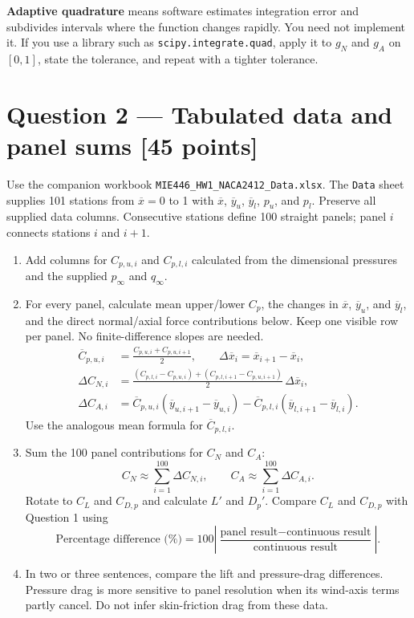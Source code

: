 \documentclass[11pt]{article}
\newcommand{\X}{\overline{x}}
\newcommand{\Yu}{\overline{y}_u}
\newcommand{\Yl}{\overline{y}_l}
\begin{document}
\textbf{Adaptive quadrature} means software estimates integration error and subdivides intervals where the function changes rapidly. You need not implement it. If you use a library such as \texttt{scipy.integrate.quad}, apply it to $g_N$ and $g_A$ on $[0,1]$, state the tolerance, and repeat with a tighter tolerance.

\section*{Question 2 — Tabulated data and panel sums \hfill [45 points]}
Use the companion workbook \texttt{MIE446\_HW1\_NACA2412\_Data.xlsx}. The \texttt{Data} sheet supplies 101 stations from $\X=0$ to 1 with $\X$, $\Yu$, $\Yl$, $p_u$, and $p_l$. Preserve all supplied data columns. Consecutive stations define 100 straight panels; panel $i$ connects stations $i$ and $i+1$.

\begin{enumerate}[label=\textbf{2\alph*.}]
\item Add columns for $C_{p,u,i}$ and $C_{p,l,i}$ calculated from the dimensional pressures and the supplied $p_\infty$ and $q_\infty$.
\item For every panel, calculate mean upper/lower $C_p$, the changes in $\X$, $\Yu$, and $\Yl$, and the direct normal/axial force contributions below. Keep one visible row per panel. No finite-difference slopes are needed.
\begin{align}
\overline C_{p,u,i}&=\frac{C_{p,u,i}+C_{p,u,i+1}}2,\qquad
\Delta\X_i=\X_{i+1}-\X_i,\\
\Delta C_{N,i}&=\frac{(C_{p,l,i}-C_{p,u,i})+(C_{p,l,i+1}-C_{p,u,i+1})}{2}\,\Delta\X_i,\\
\Delta C_{A,i}&=\overline C_{p,u,i}(\overline y_{u,i+1}-\overline y_{u,i})
-\overline C_{p,l,i}(\overline y_{l,i+1}-\overline y_{l,i}).
\end{align}
Use the analogous mean formula for $\overline C_{p,l,i}$.
\item Sum the 100 panel contributions for $C_N$ and $C_A$:
\[
C_N\approx\sum_{i=1}^{100}\Delta C_{N,i},\qquad
C_A\approx\sum_{i=1}^{100}\Delta C_{A,i}.
\]
Rotate to $C_L$ and $C_{D,p}$ and calculate $L'$ and $D_p'$. Compare $C_L$ and $C_{D,p}$ with Question 1 using
\[
\text{Percentage difference (\%)}=
100\left|\frac{\text{panel result}-\text{continuous result}}
{\text{continuous result}}\right|.
\]
\item In two or three sentences, compare the lift and pressure-drag differences. Pressure drag is more sensitive to panel resolution when its wind-axis terms partly cancel. Do not infer skin-friction drag from these data.
\end{enumerate}
\end{document}
